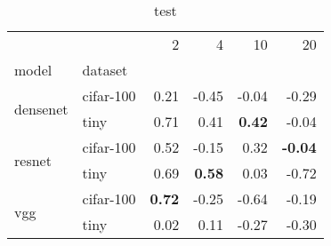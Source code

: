 \begin{table}
\caption{test}
\begin{tabular}{llrrrr}
\toprule
 &  & 2 & 4 & 10 & 20 \\
model & dataset &  &  &  &  \\
\midrule
\multirow[c]{2}{*}{densenet} & cifar-100 & 0.21 & -0.45 & -0.04 & -0.29 \\
 & tiny & 0.71 & 0.41 & \color{green} \bfseries 0.42 & -0.04 \\
\multirow[c]{2}{*}{resnet} & cifar-100 & 0.52 & -0.15 & 0.32 & \color{green} \bfseries -0.04 \\
 & tiny & 0.69 & \color{green} \bfseries 0.58 & 0.03 & -0.72 \\
\multirow[c]{2}{*}{vgg} & cifar-100 & \color{green} \bfseries 0.72 & -0.25 & -0.64 & -0.19 \\
 & tiny & 0.02 & 0.11 & -0.27 & -0.30 \\
\bottomrule
\end{tabular}
\end{table}
